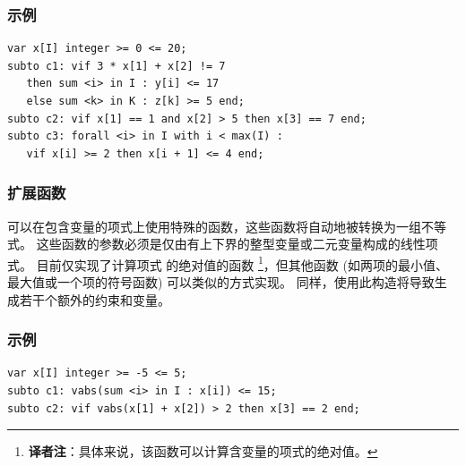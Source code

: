 \subsubsection{示例}
{\small
\begin{verbatim}
var x[I] integer >= 0 <= 20;
subto c1: vif 3 * x[1] + x[2] != 7
   then sum <i> in I : y[i] <= 17
   else sum <k> in K : z[k] >= 5 end;
subto c2: vif x[1] == 1 and x[2] > 5 then x[3] == 7 end;
subto c3: forall <i> in I with i < max(I) :
   vif x[i] >= 2 then x[i + 1] <= 4 end;
\end{verbatim}
}

\subsubsection{扩展函数}
可以在包含变量的项式上使用特殊的函数，这些函数将自动地被转换为一组不等式。
这些函数的参数必须是仅由有上下界的整型变量或二元变量构成的线性项式。
目前仅实现了计算项式  的绝对值的函数 \footnote{
   \textbf{译者注}：具体来说，该函数可以计算含变量的项式的绝对值。
}，但其他函数 (如两项的最小值、最大值或一个项的符号函数) 可以类似的方式实现。
同样，使用此构造将导致生成若干个额外的约束和变量。

\subsubsection{示例}
{\small
\begin{verbatim}
var x[I] integer >= -5 <= 5;
subto c1: vabs(sum <i> in I : x[i]) <= 15;
subto c2: vif vabs(x[1] + x[2]) > 2 then x[3] == 2 end;
\end{verbatim}
}




